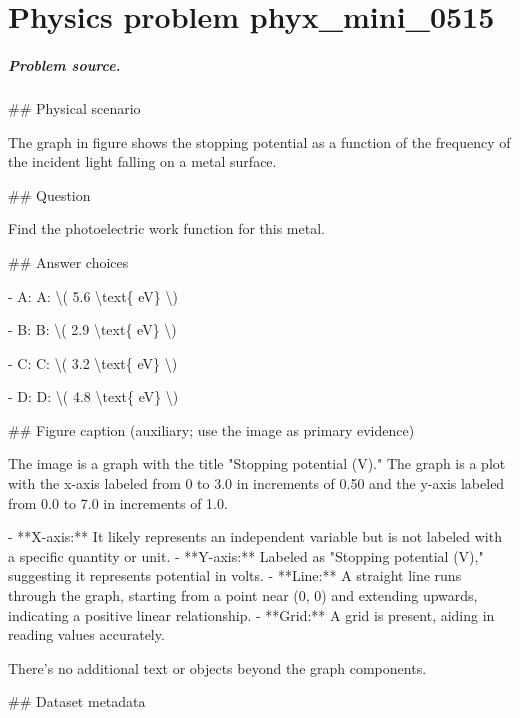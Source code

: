 
\chapter{Physics problem phyx\_mini\_0515}
\label{ch:PhyXMiniProblems_problem_phyx_mini_0515}

\paragraph{Problem source.}
\#\# Physical scenario

The graph in figure shows the stopping potential as a function of the frequency of the incident light falling on a metal surface.

\#\# Question

Find the photoelectric work function for this metal.

\#\# Answer choices

- A: A: \textbackslash{}( 5.6 \textbackslash{}text\{ eV\} \textbackslash{})

- B: B: \textbackslash{}( 2.9 \textbackslash{}text\{ eV\} \textbackslash{})

- C: C: \textbackslash{}( 3.2 \textbackslash{}text\{ eV\} \textbackslash{})

- D: D: \textbackslash{}( 4.8 \textbackslash{}text\{ eV\} \textbackslash{})

\#\# Figure caption (auxiliary; use the image as primary evidence)

The image is a graph with the title "Stopping potential (V)." The graph is a plot with the x-axis labeled from 0 to 3.0 in increments of 0.50 and the y-axis labeled from 0.0 to 7.0 in increments of 1.0.

- **X-axis:** It likely represents an independent variable but is not labeled with a specific quantity or unit.
- **Y-axis:** Labeled as "Stopping potential (V)," suggesting it represents potential in volts.
- **Line:** A straight line runs through the graph, starting from a point near (0, 0) and extending upwards, indicating a positive linear relationship.
- **Grid:** A grid is present, aiding in reading values accurately.

There's no additional text or objects beyond the graph components.

\#\# Dataset metadata

